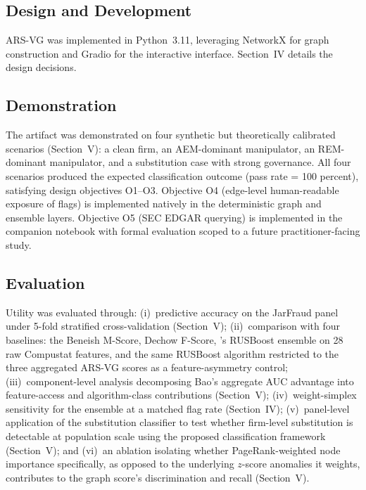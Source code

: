 \documentclass[12pt]{article}
\begin{document}
\subsection*{Design and Development}

ARS-VG was implemented in Python~3.11, leveraging NetworkX for graph
construction and Gradio for the interactive interface.  Section~IV details
the design decisions.

\subsection*{Demonstration}

The artifact was demonstrated on four synthetic but theoretically calibrated
scenarios (Section~V): a clean firm, an AEM-dominant
manipulator, an REM-dominant manipulator, and a substitution case with strong
governance.  All four scenarios produced the expected classification outcome
(pass rate = 100 percent), satisfying design objectives O1--O3.  Objective
O4 (edge-level human-readable exposure of flags) is implemented
natively in the deterministic graph and ensemble layers.  Objective O5 (SEC EDGAR querying) is
implemented in the companion notebook with formal evaluation scoped
to a future practitioner-facing study.

\subsection*{Evaluation}

Utility was evaluated through: (i)~predictive accuracy on the JarFraud
panel under 5-fold stratified cross-validation
(Section~V); (ii)~comparison with four baselines: the
Beneish M-Score, Dechow F-Score,
\citet{bao2020}'s RUSBoost ensemble on 28 raw Compustat features, and
the same RUSBoost algorithm restricted to the three aggregated ARS-VG
scores as a feature-asymmetry control; (iii)~component-level analysis
decomposing Bao's aggregate AUC advantage into feature-access and
algorithm-class contributions (Section~V);
(iv)~weight-simplex sensitivity for the ensemble at a matched flag
rate (Section~IV); (v)~panel-level application of the
substitution classifier to test whether firm-level substitution is
detectable at population scale using the proposed classification
framework (Section~V); and (vi)~an ablation isolating whether
PageRank-weighted node importance specifically, as opposed to the
underlying $z$-score anomalies it weights, contributes to the graph
score's discrimination and recall (Section~V).
\end{document}
